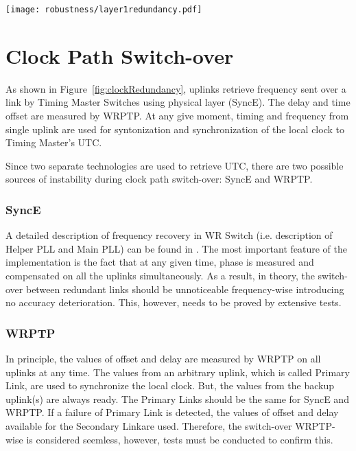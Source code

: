\begin{center}
	\texttt{[image: robustness/layer1redundancy.pdf]}
	\label{fig:clockRedundancy}
\end{center}

\section{Clock Path Switch-over}

As shown in Figure~\ref{fig:clockRedundancy}, uplinks retrieve frequency
sent over a link by Timing Master Switches using physical layer (SyncE). The
delay and time offset are measured by WRPTP. At any give moment,
timing and frequency from single uplink are used for syntonization and
synchronization of the local clock to Timing Master's UTC.

Since two separate technologies are used to retrieve UTC, there are two
possible sources of instability during clock path switch-over: SyncE and WRPTP.

\subsubsection{SyncE}

A detailed description of frequency recovery in WR Switch (i.e. description of
Helper PLL and Main PLL) can be found in \cite{TomekMSc}. The most important
feature of the implementation is the fact that at any given time, phase is
measured and compensated on all the uplinks simultaneously. As a result, in
theory, the switch-over between redundant links should be unnoticeable
frequency-wise introducing no accuracy deterioration. This, however, needs to be
proved by extensive tests.

\subsubsection{WRPTP} 

In principle, the values of offset and delay are measured by WRPTP on all
uplinks at any time. The values from an arbitrary uplink, which is called
Primary Link, are used to synchronize the local clock. But, the values from the
backup uplink(s) are always ready. The Primary Links should be the same
for SyncE and WRPTP. If a failure of Primary Link is detected, the values of
offset and delay available for the Secondary Linkare used. Therefore, the
switch-over WRPTP-wise is considered seemless, however, tests must be conducted
to confirm this.

